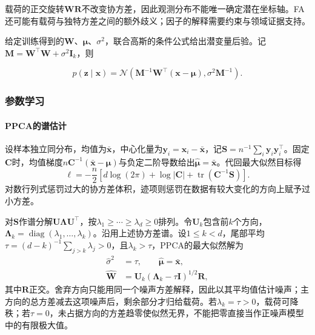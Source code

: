载荷的正交旋转$\bm W\bm R$不改变协方差，因此观测分布不能唯一确定潜在坐标轴。FA还可能有载荷与独特方差之间的额外歧义；因子的解释需要约束与领域证据支持。

给定训练得到的$\bm W$、$\bm\mu$、$\sigma^2$，联合高斯的条件公式给出潜变量后验。记$\bm M=\bm W^\top\bm W+\sigma^2\bm I_k$，则

\begin{equation}
\label{eq:dim-ppca-posterior}
p(\bm{z}\mid\bm{x})
=\mathcal{N}\left(
\bm{M}^{-1}\bm{W}^\top(\bm{x}-\bm{\mu}),
\sigma^2\bm{M}^{-1}\right).
\end{equation}


\subsubsection{参数学习}
\label{sec:dim-ppca-learning}

\paragraph{PPCA的谱估计}

设样本独立同分布，均值为$\bar{\bm{x}}$，中心化量为$\bm{y}_i=\bm{x}_i-\bar{\bm{x}}$，记$\bm{S}=n^{-1}\sum_i\bm{y}_i\bm{y}_i^\top$。固定$\bm{C}$时，均值梯度$n\bm{C}^{-1}(\bar{\bm{x}}-\bm{\mu})$与负定二阶导数给出$\hat{\bm{\mu}}=\bar{\bm{x}}$。代回最大似然目标得
\begin{equation}
\label{eq:dim-ppca-likelihood}
\ell=-\frac{n}{2}\left[
d\log(2\pi)+\log|\bm{C}|
+\operatorname{tr}(\bm{C}^{-1}\bm{S})\right].
\end{equation}
对数行列式惩罚过大的协方差体积，迹项则惩罚在数据有较大变化的方向上赋予过小方差。

对$\bm{S}$作谱分解$\bm{U}\bm{\Lambda}\bm{U}^\top$，按$\lambda_1\geq\cdots\geq\lambda_d\geq0$排列。令$\bm{U}_k$包含前$k$个方向，$\bm{\Lambda}_k=\operatorname{diag}(\lambda_1,\ldots,\lambda_k)$。沿用上述协方差谱。设$1\leq k<d$，尾部平均$\tau=(d-k)^{-1}\sum_{j>k}\lambda_j>0$，且$\lambda_k>\tau$，PPCA的最大似然解为
\begin{equation}
 \label{eq:dim-ppca-mle}
 \begin{aligned}
 \hat\sigma^2&=\tau,\qquad \hat{\bm\mu}=\bar{\bm x},\\
 \hat{\bm W}&=\bm U_k(\bm\Lambda_k-\tau\bm I)^{1/2}\bm R,
 \end{aligned}
\end{equation}
其中$\bm R$正交。舍弃方向只能用同一个噪声方差解释，因此以其平均值估计噪声；主方向的总方差减去这项噪声后，剩余部分才归给载荷。若$\lambda_k=\tau>0$，载荷可降秩；若$\tau=0$，未占据方向的方差趋零使似然无界，不能把零直接当作正噪声模型中的有限极大值。

